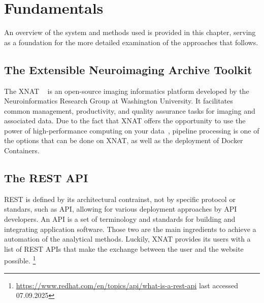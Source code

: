 
\chapter{Fundamentals}

An overview of the system and methods used is provided in this chapter, serving as a foundation for the more detailed examination of the approaches that follows. 

\section{The Extensible Neuroimaging Archive Toolkit}
The \ac{XNAT} ~\cite{marcus_extensible_2007} is an open-source imaging informatics platform developed by the Neuroinformatics Research Group at Washington University. It facilitates common management, productivity, and quality assurance tasks for imaging and associated data. Due to the fact that XNAT offers the opportunity to use the power of high-performance computing on your data~\cite{zaschke_extending_2024}, 
pipeline processing is one of the options that can be done on XNAT, as well as the deployment of Docker Containers.


\section{The REST API}
\ac{REST} is defined by its architectural contrainst, not by specific protocol or standars, such as API, allowing for various deployment approaches by API developers.
An \ac{API} is a set of terminology and standards for building and integrating application software. Those two are the main ingredients to achieve a automation of the analytical methods.  Luckily, XNAT provides its users with a list of REST APIs that make the exchange between the user and the website possible. 
 \footnote{\url{https://www.redhat.com/en/topics/api/what-is-a-rest-api}{ last accessed 07.09.2025}}

